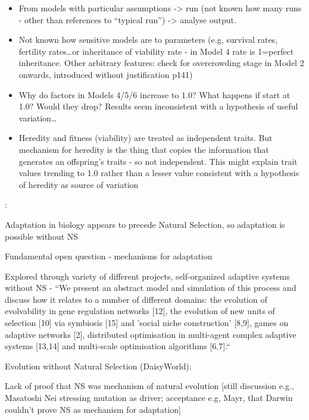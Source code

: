 	
\begin{itemize}
	\item From models with particular assumptions -\textgreater{} run
		(not known how many runs - other than references to ``typical run'')
		-\textgreater{} analyse output.
	
	\item Not known how sensitive models are to parameters (e.g,
		survival rates, fertility rates\ldots{}or inheritance of viability
		rate - in Model 4 rate is 1=perfect inheritance. Other arbitrary
		features: check for overcrowding stage in Model 2 onwards,
		introduced without justification p141)
	
	\item Why do factors in Models 4/5/6 increase to 1.0? What happens
		if start at 1.0? Would they drop? Results seem inconsistent with a
		hypothesis of useful variation\ldots{}
	
	\item Heredity and fitness (viability) are treated as independent
		traits. But mechanism for heredity is the thing that copies the
		information that generates an offspring's traits - so not
		independent. This might explain trait values trending to 1.0 rather
		than a lesser value consistent with a hypothesis of heredity as
		source of variation
	
\end{itemize}
	
\autocite{Watson2010}:

	Adaptation in biology appears to precede Natural Selection, so adaptation is possible without NS \autocite{Watson2010}

	Fundamental open question - mechanisms for adaptation
	
	Explored through variety of different projects, self-organized
	adaptive systems without NS - ``We present an abstract model and
	simulation of this process and discuss how it relates to a number of
	different domains: the evolution of evolvability in gene regulation
	networks {[}12{]}, the evolution of new units of selection {[}10{]}
	via symbiosis {[}15{]} and 'social niche construction' {[}8,9{]},
	games on adaptive networks {[}2{]}, distributed optimisation in
	multi-agent complex adaptive systems {[}13,14{]} and multi-scale
	optimisation algorithms {[}6,7{]}.``


\autocite{Saunders1994} Evolution without Natural Selection (DaisyWorld):

	Lack of proof that NS was mechanism of natural evolution {[}still
	discussion e.g., Masatoshi Nei stressing mutation as driver;
	acceptance e.g, Mayr, that Darwin couldn't prove NS as mechanism for
	adaptation{]}

